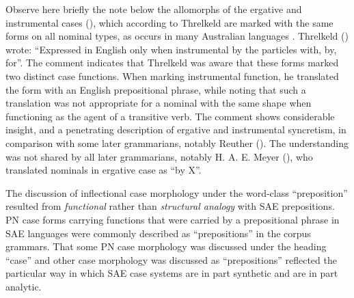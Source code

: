 Observe here briefly the note below the allomorphs of the ergative and instrumental cases (), which according to Threlkeld are marked with the same forms on all nominal types, as occurs in many Australian languages \citep[135]{dixon_australian_2002}. Threlkeld (\citeyear[77]{threlkeld_australian_1834}) wrote: “Expressed in English only when instrumental by the particles with, by, for”. The comment indicates that Threlkeld was aware that these forms marked two distinct case functions. When marking instrumental function, he translated the form with an English prepositional phrase, while noting that such a translation was not appropriate for a nominal with the same shape when functioning as the agent of a transitive verb. The comment shows considerable insight, and a penetrating description of ergative and instrumental syncretism, in comparison with some later grammarians, notably Reuther (). The understanding was not shared by all later grammarians, notably H. A. E. Meyer (), who translated nominals in ergative case as “by X”.

The discussion of inflectional case morphology under the word-class “preposition” resulted from \textit{functional} rather than \textit{structural analogy} with SAE prepositions. PN case forms carrying functions that were carried by a prepositional phrase in SAE languages were commonly described as “prepositions” in the corpus grammars. That some PN case morphology was discussed under the heading “case” and other case morphology was discussed as “prepositions” reflected the particular way in which SAE case systems are in part synthetic and are in part analytic. 


